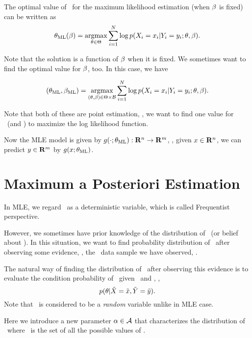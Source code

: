 The optimal value of \param\ for the maximum likelihood estimation (when $\beta$ is fixed) can be written as
\begin{equation}
\label{eq:mle-solution}
{\ensuremath{\theta}}_\mathrm{ML}(\beta) = \mathop{\mathrm {argmax}}_{\theta\in\Theta} \sum_{i=1}^{N} \log p(X_i=x_i| Y_i=y_i; \theta, \beta).
\end{equation}

Note that the solution is a function of $\beta$ when it is fixed.
We sometimes want to find the optimal value for $\beta$, too.
In this case,
we have

\begin{equation}
\label{eq:mle-solution-1}
({\theta}_\mathrm{ML}, {\beta}_\mathrm{ML}) = \mathop{\mathrm {argmax}}_{(\theta, \beta)\in\Theta\times \mathcal{B}} \sum_{i=1}^{N} \log p(X_i=x_i| Y_i=y_i; \theta, \beta).
\end{equation}

Note that both of these are point estimation, \ie,
we want to find one value for \param\ (and \noise) to maximize the log likelihood function.

Now the MLE model is given by $g(\cdot; {\theta}_\mathrm{ML}): \mathbf{R}^n \to \mathbf{R}^m$,
\ie, given $x\in\mathbf{R}^n$, we can predict $y\in\mathbf{R}^m$ by $g(x; {\theta}_\mathrm{ML})$.

\section{Maximum a Posteriori Estimation}

In MLE, we regard \param\ as a deterministic variable,
which is called Frequentist perspective.

However, we sometimes have prior knowledge of the distribution of \param\ (or belief about \param).
In this situation, we want to find probability distribution of \param\ after observing some evidence,
\eg, the \numsamples\ data sample we have observed, .

The natural way of finding the distribution of \param\ after observing this evidence
is to evaluate the condition probability of \param\ given \bigx\ and \bigy, \ie,
\begin{equation}
p(\theta|\tilde{X}=\tilde{x}, \tilde{Y}=\tilde{y}).
\end{equation}
Note that \param\ is considered to be a \emph{random} variable
unlike in MLE case.

Here we introduce a new parameter $\alpha\in\mathcal{A}$ that characterizes the distribution of \param\
where \priorset\ is the set of all the possible values of \prior.

